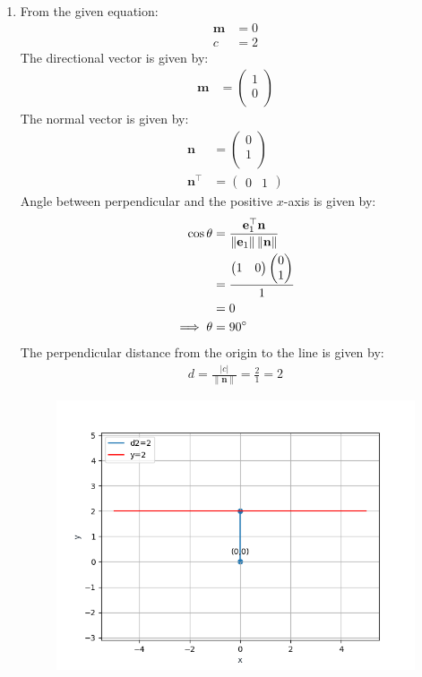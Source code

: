 \documentclass[12pt]{article}
\providecommand{\norm}[1]{\left\lVert#1\right\rVert}
\newcommand{\myvec}[1]{\ensuremath{\begin{pmatrix}#1\end{pmatrix}}}
\let\vec\mathbf
\begin{document}
\begin{enumerate}
\begin{figure}[H]
\begin{center}
	\end{center}
\caption{}
\label{fig:Fig1}
\end{figure}
\item From the given equation:
         \begin{align}                                                                                                 \vec{m}&=0\\                                                                        			c&=2
         \end{align}                                                                                          The directional vector is given by:
          \begin{align}
                  \vec{m}&=\myvec{1\\0\\}
          \end{align}
          The normal vector is given by:
                  \begin{align}
         \vec{n}&=\myvec{0\\1\\}\\
          \vec{n}^\top&=\myvec{0 & 1}
                          \end{align}
          Angle between perpendicular and the positive $x$-axis is given by:
		\begin{align}  
\cos\theta&=\frac{\vec{e}_{1}^\top\vec{n}}{\norm{\vec{e}_{1}}\norm{\vec{n}}}\\
			&=\frac{\myvec{1&0}\myvec{0 \\ 1\\}}{1}\\
			&=0\\
			\implies	\theta&=90\degree       
                \end{align}      
 The perpendicular distance from the origin to the line is given by:    
                                      \begin{align}
					      d=\frac{|c|}{\norm{\vec{n}}}=\frac{2}{1}=2             
                  \end{align}
\begin{figure}[H]
\begin{center} 
	    \includegraphics[width=\columnwidth]{figs/line2.png}

\end{center}
\end{figure}
\end{enumerate}
\end{document}

